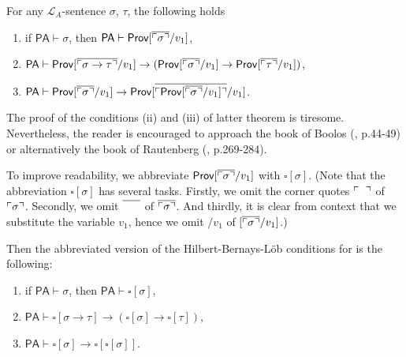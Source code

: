 \begin{thm}\label{dfn:HBL}
For any $\mathcal{L}_A$-sentence $\sigma$, $\tau$, the following holds
\begin{enumerate}[label=({HBL\arabic*})]
\item if $\mathsf{PA} \vdash \sigma$, then $\mathsf{PA} \vdash  \mathsf{Prov}[\overline{\ulcorner\sigma \urcorner}/v_1] $,
\item $\mathsf{PA} \vdash  \mathsf{Prov}[\overline{\ulcorner\sigma \rightarrow \tau \urcorner}/v_1] \rightarrow ( \mathsf{Prov}[\overline{\ulcorner\sigma \urcorner}/v_1] \rightarrow \mathsf{Prov}[\overline{\ulcorner\tau \urcorner}/v_1])$,
\item $\mathsf{PA} \vdash \mathsf{Prov}[\overline{\ulcorner\sigma \urcorner}/v_1]  \rightarrow \mathsf{Prov}[\overline{\ulcorner\mathsf{Prov}[\overline{\ulcorner\sigma \urcorner}/v_1] \urcorner}/v_1]$.
\end{enumerate}
\end{thm}

The proof of the conditions (ii) and (iii) of latter theorem is tiresome. Nevertheless, the reader is encouraged to approach the book of Boolos (\cite{Boolos1994}, p.44-49) or alternatively the book of Rautenberg (\cite{2006a}, p.269-284).


To improve readability, we abbreviate $\mathsf{Prov}[\overline{\ulcorner\sigma\urcorner}/v_1]$ with $\square[\sigma]$. (Note that the abbreviation $\square[\sigma]$ has several tasks. Firstly, we omit the corner quotes $\ulcorner \phantom{\sigma} \urcorner$ of $\ulcorner \sigma \urcorner$. Secondly, we omit $\overline{\phantom{\upl \sigma \upr}}$ of $\overline{\ulcorner \sigma \urcorner}$. And thirdly, it is clear from context that we substitute the variable $v_1$, hence we omit $/v_1$ of $[\overline{\ulcorner \sigma \urcorner}/v_1]$.)

Then the abbreviated version of the Hilbert-Bernays-L\"ob conditions for \PA is the following:
\begin{enumerate}[label=(HBL\arabic*)]
\item if $\mathsf{PA} \vdash \sigma$, then $\mathsf{PA} \vdash \square [\sigma]$,
\item $\mathsf{PA} \vdash  \square [ \sigma \rightarrow \tau] \rightarrow ( \square [\sigma] \rightarrow \square [\tau])$,
\item $\mathsf{PA} \vdash \square [\sigma ] \rightarrow \square [\square [\sigma]]$.
\end{enumerate}

